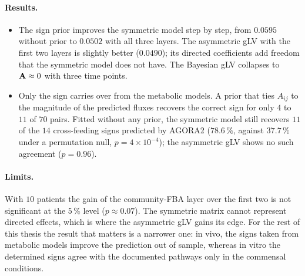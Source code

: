 \paragraph{Results.}
\begin{itemize}
  \item The sign prior improves the symmetric model step by step, from
        $0.0595$ without prior to $0.0502$ with all three layers. The
        asymmetric gLV with the first two layers is slightly better
        ($0.0490$); its directed coefficients add freedom that the symmetric
        model does not have. The Bayesian gLV collapses to $\mathbf{A}\approx0$ with
        three time points.
  \item Only the sign carries over from the metabolic models. A prior that
        ties $A_{ij}$ to the magnitude of the predicted fluxes recovers the
        correct sign for only $4$ to $11$ of $70$ pairs. Fitted without any
        prior, the symmetric model still recovers $11$ of the $14$
        cross-feeding signs predicted by AGORA2 ($78.6\,\%$, against $37.7\,\%$
        under a permutation null, $p=4\times10^{-4}$); the asymmetric gLV
        shows no such agreement ($p=0.96$).
\end{itemize}

\paragraph{Limits.} With $10$ patients the gain of the community-FBA layer over
the first two is not significant at the $5\,\%$ level ($p\approx0.07$). The symmetric
matrix cannot represent directed effects, which is where the asymmetric gLV
gains its edge. For the rest of this thesis the result that matters is a
narrower one: in vivo, the signs taken from metabolic models improve the
prediction out of sample, whereas in vitro the determined signs agree with the
documented pathways only in the commensal conditions.
